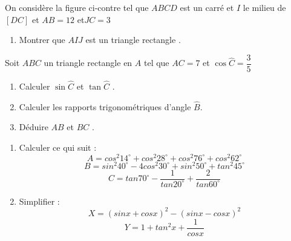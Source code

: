 \documentclass[a4paper,12pt]{article}
\begin{document}
\devoir[ds=false,num=3 ,niv=3 , date=05/01/2023,Rdate=09/01/2023 ,prv=true]

\begin{exo}
\begin{minipage}{0.6\linewidth}
On considère la figure ci-contre tel que $ABCD$ est un  carré  et $I$ le milieu de $[DC]$ et $AB=12$ et$JC=3$
\begin{enumerate}
\item Montrer que $AIJ$ est un triangle rectangle .
\end{enumerate}
\end{minipage}
\begin{minipage}{0.4\linewidth}
\end{minipage}
\end{exo}

\begin{exo}

Soit  $ABC$ un triangle rectangle en $A$ tel que  $AC=7$ et $\cos \widehat{C}=\dfrac{3}{5}$
\begin{enumerate}
\item Calculer  $\sin \widehat{C}$ et $\tan \widehat{C}$ .
\item Calculer les rapports trigonométriques d'angle $\widehat{B}$.
\item Déduire $AB$ et $BC$ .
\end{enumerate}
\end{exo}

\begin{exo}
\begin{enumerate}
\item Calculer ce qui suit :
$$A= cos^{2}14^{\circ}+cos^{2}28^{\circ}+cos^{2}76^{\circ}+cos^{2}62^{\circ}$$
$$B=sin^{2}40^{\circ}-4cos^{2}30^{\circ}+sin^{2}50^{\circ}+tan^{2}45^{\circ}$$
$$C=tan70^{\circ}-\dfrac{1}{tan20^{\circ}}+\dfrac{2}{tan60^{\circ}}$$
\item Simplifier :
$$ X=(sinx+cosx)^{2}-(sinx-cosx)^{2} $$
$$ Y=1+tan^{2}x+\dfrac{1}{cosx}$$
\end{enumerate}

\end{exo}
\end{document}
